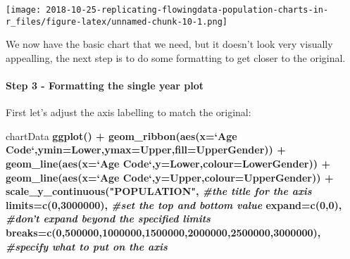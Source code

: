 \documentclass[]{article}
\newenvironment{Shaded}{\begin{snugshade}}{\end{snugshade}}
\newcommand{\KeywordTok}[1]{\textcolor[rgb]{0.13,0.29,0.53}{\textbf{#1}}}
\newcommand{\DataTypeTok}[1]{\textcolor[rgb]{0.13,0.29,0.53}{#1}}
\newcommand{\DecValTok}[1]{\textcolor[rgb]{0.00,0.00,0.81}{#1}}
\newcommand{\StringTok}[1]{\textcolor[rgb]{0.31,0.60,0.02}{#1}}
\newcommand{\CommentTok}[1]{\textcolor[rgb]{0.56,0.35,0.01}{\textit{#1}}}
\newcommand{\OperatorTok}[1]{\textcolor[rgb]{0.81,0.36,0.00}{\textbf{#1}}}
\newcommand{\NormalTok}[1]{#1}
\let\oldparagraph\paragraph
\renewcommand{\paragraph}[1]{\oldparagraph{#1}\mbox{}}
\begin{document}
\texttt{[image: 2018-10-25-replicating-flowingdata-population-charts-in-r\_files/figure-latex/unnamed-chunk-10-1.png]}

We now have the basic chart that we need, but it doesn't look very
visually appealling, the next step is to do some formatting to get
closer to the original.

\paragraph{Step 3 - Formatting the single year
plot}\label{step-3---formatting-the-single-year-plot}

First let's adjust the axis labelling to match the original:

\begin{Shaded}
\begin{Highlighting}[]
\NormalTok{chartData }\OperatorTok{%>%}\StringTok{ }\KeywordTok{filter}\NormalTok{(Year}\OperatorTok{==}\DecValTok{2014}\NormalTok{) }\OperatorTok{%>%}
\StringTok{  }\KeywordTok{ggplot}\NormalTok{() }\OperatorTok{+}
\StringTok{  }\KeywordTok{geom_ribbon}\NormalTok{(}\KeywordTok{aes}\NormalTok{(}\DataTypeTok{x=}\StringTok{`}\DataTypeTok{Age Code}\StringTok{`}\NormalTok{,}\DataTypeTok{ymin=}\NormalTok{Lower,}\DataTypeTok{ymax=}\NormalTok{Upper,}\DataTypeTok{fill=}\NormalTok{UpperGender)) }\OperatorTok{+}
\StringTok{  }\KeywordTok{geom_line}\NormalTok{(}\KeywordTok{aes}\NormalTok{(}\DataTypeTok{x=}\StringTok{`}\DataTypeTok{Age Code}\StringTok{`}\NormalTok{,}\DataTypeTok{y=}\NormalTok{Lower,}\DataTypeTok{colour=}\NormalTok{LowerGender)) }\OperatorTok{+}
\StringTok{  }\KeywordTok{geom_line}\NormalTok{(}\KeywordTok{aes}\NormalTok{(}\DataTypeTok{x=}\StringTok{`}\DataTypeTok{Age Code}\StringTok{`}\NormalTok{,}\DataTypeTok{y=}\NormalTok{Upper,}\DataTypeTok{colour=}\NormalTok{UpperGender)) }\OperatorTok{+}
\StringTok{  }\KeywordTok{scale_y_continuous}\NormalTok{(}\StringTok{"POPULATION"}\NormalTok{, }\CommentTok{#the title for the axis}
                     \DataTypeTok{limits=}\KeywordTok{c}\NormalTok{(}\DecValTok{0}\NormalTok{,}\DecValTok{3000000}\NormalTok{), }\CommentTok{#set the top and bottom value}
                     \DataTypeTok{expand=}\KeywordTok{c}\NormalTok{(}\DecValTok{0}\NormalTok{,}\DecValTok{0}\NormalTok{), }\CommentTok{#don't expand beyond the specified limits}
                     \DataTypeTok{breaks=}\KeywordTok{c}\NormalTok{(}\DecValTok{0}\NormalTok{,}\DecValTok{500000}\NormalTok{,}\DecValTok{1000000}\NormalTok{,}\DecValTok{1500000}\NormalTok{,}\DecValTok{2000000}\NormalTok{,}\DecValTok{2500000}\NormalTok{,}\DecValTok{3000000}\NormalTok{), }\CommentTok{#specify what to put on the axis}
}
\end{Highlighting}
\end{Shaded}
\end{document}

